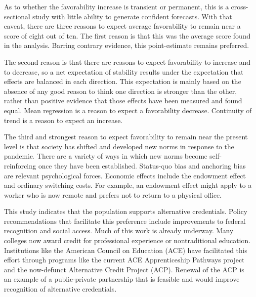 \documentclass[review]{elsarticle}
\begin{document}
As to whether the favorability increase is transient or permanent,
this is a cross-sectional study with little ability to generate confident forecasts.
With that caveat, there are three reasons to expect average favorability to remain near a score of eight out of ten.
The first reason is that this was the average score found in the analysis.
Barring contrary evidence, this point-estimate remains preferred.

The second reason is that there are reasons to expect favorability to increase and to decrease,
so a net expectation of stability results under the expectation that effects are balanced in each direction.
This expectation is mainly based on the absence of any good reason to think one direction is stronger than the other,
rather than positive evidence that those effects have been measured and found equal.
Mean regression is a reason to expect a favorability decrease.
Continuity of trend is a reason to expect an increase.

The third and strongest reason to expect favorability to remain near the present level is that
society has shifted and developed new norms in response to the pandemic.
There are a variety of ways in which new norms become self-reinforcing once they have been established.
Status-quo bias and anchoring bias are relevant psychological forces.
Economic effects include the endowment effect and ordinary switching costs.
For example, an endowment effect might apply to a worker who is now remote and prefers not to return to a physical office.

This study indicates that the population supports alternative credentials.
Policy recommendations that facilitate this preference include improvements to federal recognition and social access.
Much of this work is already underway.
Many colleges now award credit for professional experience or nontraditional education.
Institutions like the American Council on Education (ACE)
have facilitated this effort through programs like the current ACE Apprenticeship Pathways project
and the now-defunct Alternative Credit Project (ACP). %
Renewal of the ACP is an example of a public-private partnership that is feasible and would improve recognition of alternative credentials.
\end{document}

